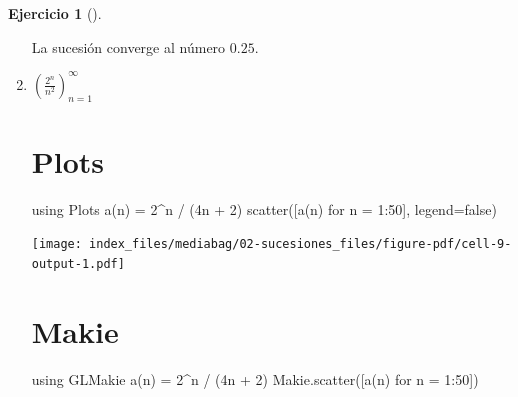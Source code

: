 \documentclass[
  a4paper,
]{scrreport}
\newenvironment{Shaded}{\begin{snugshade}}{\end{snugshade}}
\newcommand{\BuiltInTok}[1]{\textcolor[rgb]{0.00,0.23,0.31}{#1}}
\newcommand{\ConstantTok}[1]{\textcolor[rgb]{0.56,0.35,0.01}{#1}}
\newcommand{\FloatTok}[1]{\textcolor[rgb]{0.68,0.00,0.00}{#1}}
\newcommand{\FunctionTok}[1]{\textcolor[rgb]{0.28,0.35,0.67}{#1}}
\newcommand{\ImportTok}[1]{\textcolor[rgb]{0.00,0.46,0.62}{#1}}
\newcommand{\NormalTok}[1]{\textcolor[rgb]{0.00,0.23,0.31}{#1}}
\newcommand{\OperatorTok}[1]{\textcolor[rgb]{0.37,0.37,0.37}{#1}}
\theoremstyle{definition}
\newtheorem{exercise}{Ejercicio}[chapter]
\theoremstyle{remark}
\begin{document}
\begin{exercise}[]
\begin{enumerate}
\begin{tcolorbox}
  La sucesión converge al número \(0.25\).

  \end{tcolorbox}
\item
  \(\left(\frac{2^n}{n^2}\right)_{n=1}^\infty\)

  \begin{tcolorbox}[enhanced jigsaw, bottomtitle=1mm, rightrule=.15mm, left=2mm, colback=white, title=\textcolor{quarto-callout-tip-color}{\faLightbulb}\hspace{0.5em}{Solución}, bottomrule=.15mm, colframe=quarto-callout-tip-color-frame, toprule=.15mm, leftrule=.75mm, opacityback=0, coltitle=black, breakable, colbacktitle=quarto-callout-tip-color!10!white, arc=.35mm, toptitle=1mm, titlerule=0mm, opacitybacktitle=0.6]

  \section{Plots}

\begin{Shaded}
\begin{Highlighting}[]
\ImportTok{using} \BuiltInTok{Plots}
\FunctionTok{a}\NormalTok{(n) }\OperatorTok{=} \FloatTok{2}\OperatorTok{\^{}}\NormalTok{n }\OperatorTok{/}\NormalTok{ (}\FloatTok{4}\NormalTok{n }\OperatorTok{+} \FloatTok{2}\NormalTok{)}
\FunctionTok{scatter}\NormalTok{([}\FunctionTok{a}\NormalTok{(n) for n }\OperatorTok{=} \FloatTok{1}\OperatorTok{:}\FloatTok{50}\NormalTok{], legend}\OperatorTok{=}\ConstantTok{false}\NormalTok{)}
\end{Highlighting}
\end{Shaded}

  \texttt{[image: index\_files/mediabag/02-sucesiones\_files/figure-pdf/cell-9-output-1.pdf]}

  \section{Makie}

\begin{Shaded}
\begin{Highlighting}[]
\ImportTok{using} \BuiltInTok{GLMakie}
\FunctionTok{a}\NormalTok{(n) }\OperatorTok{=} \FloatTok{2}\OperatorTok{\^{}}\NormalTok{n }\OperatorTok{/}\NormalTok{ (}\FloatTok{4}\NormalTok{n }\OperatorTok{+} \FloatTok{2}\NormalTok{)}
\NormalTok{Makie.}\FunctionTok{scatter}\NormalTok{([}\FunctionTok{a}\NormalTok{(n) for n }\OperatorTok{=} \FloatTok{1}\OperatorTok{:}\FloatTok{50}\NormalTok{])}
\end{Highlighting}
\end{Shaded}


\end{tcolorbox}
\end{enumerate}
\end{exercise}
\end{document}
